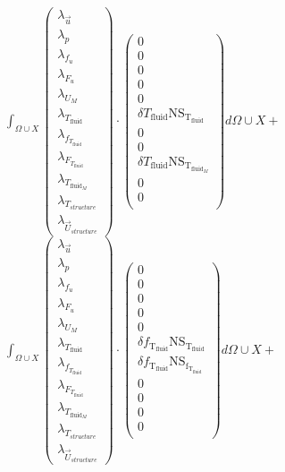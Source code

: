 \documentclass[10pt]{article} %
\begin{document}
\begin{center}
	$\int_{\Omega \cup X}
	\begin{pmatrix}
		\lambda_{\vec{u}} \\ \lambda_p \\ \lambda_{f_u} \\ \lambda_{F_u} \\ \lambda_{U_M}\\ \lambda_{T_{\text{fluid}}} \\ \lambda_{f_{T_{\text{fluid}}}} \\ \lambda_{F_{T_{\text{fluid}}}} \\ \lambda_{T_{\text{fluid}_M}} \\ \lambda_{T_{structure}} \\ \lambda_{\vec{U}_{structure}}
	\end{pmatrix}
	\cdot
	\begin{pmatrix}
		0 \\
		0\\
		0 \\
		0 \\
		0 \\
		\delta T_{\text{fluid}} \text{NS}_{\text{T}_{\text{fluid}}} \\
		0\\
		0\\
		\delta T_{\text{fluid}} \text{NS}_{\text{T}_{\text{fluid}_M}}\\
		0\\
		0\\
	\end{pmatrix}
	d\Omega \cup X + $\\

	$\int_{\Omega \cup X}
	\begin{pmatrix}
		\lambda_{\vec{u}} \\ \lambda_p \\ \lambda_{f_u} \\ \lambda_{F_u} \\ \lambda_{U_M}\\ \lambda_{T_{\text{fluid}}} \\ \lambda_{f_{T_{\text{fluid}}}} \\ \lambda_{F_{T_{\text{fluid}}}} \\ \lambda_{T_{\text{fluid}_M}} \\ \lambda_{T_{structure}} \\ \lambda_{\vec{U}_{structure}}
	\end{pmatrix}
	\cdot
	\begin{pmatrix}
		0 \\
		0\\
		0 \\
		0 \\
		0 \\
		\delta f_{\text{T}_{\text{fluid}}} \text{NS}_{\text{T}_{\text{fluid}}} \\
		\delta f_{\text{T}_{\text{fluid}}} \text{NS}_{\text{f}_{\text{T}_{\text{fluid}}}}\\
		0\\
		0\\
		0\\
		0\\
	\end{pmatrix}
	d\Omega \cup X + $\\


\end{center}
\end{document}
